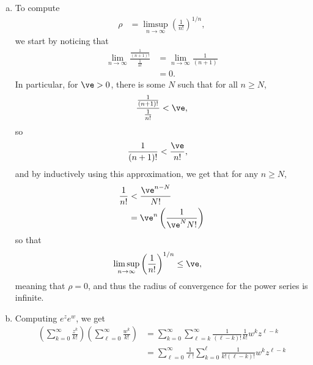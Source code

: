 \documentclass[10pt]{mypackage}
\begin{document}
\begin{solution}\hfill
  \begin{enumerate}[(a)]
    \item To compute
      \begin{align*}
        \rho &= \limsup_{n\rightarrow\infty} \left( \frac{1}{n!} \right)^{1/n},
      \end{align*}
      we start by noticing that
      \begin{align*}
        \lim_{n\rightarrow\infty} \frac{\frac{1}{\left( n+1 \right)!}}{\frac{1}{n!}} &= \lim_{n\rightarrow\infty} \frac{1}{\left( n+1 \right)}\\
                                                                                     &= 0.
      \end{align*}
      In particular, for $\ve > 0$, there is some $N$ such that for all $n\geq N$,
      \begin{align*}
        \frac{\frac{1}{\left( n+1 \right)!}}{\frac{1}{n!}} < \ve,
      \end{align*}
      so
      \begin{align*}
        \frac{1}{\left( n+1 \right)!} &< \frac{\ve}{n!},
      \end{align*}
      and by inductively using this approximation, we get that for any $n\geq N$,
      \begin{align*}
        \frac{1}{n!} &<  \frac{\ve^{n-N}}{N!}\\
                     &= \ve^{n} \left( \frac{1}{\ve^{N}N!} \right)
      \end{align*}
      so that
      \begin{align*}
        \limsup_{n\rightarrow\infty} \left( \frac{1}{n!} \right)^{1/n} &\leq \ve,
      \end{align*}
      meaning that $\rho = 0$, and thus the radius of convergence for the power series is infinite.
    \item Computing $e^{z}e^{w}$, we get
      \begin{align*}
        \left( \sum_{k=0}^{\infty}\frac{z^{k}}{k!} \right)\left( \sum_{\ell = 0}^{\infty}\frac{w^{k}}{k!} \right) &= \sum_{k=0}^{\infty}\sum_{\ell = k}^{\infty} \frac{1}{\left( \ell - k \right)!}\frac{1}{k!}w^{k}z^{\ell - k}\\
                                                                                                                  &= \sum_{\ell = 0}^{\infty} \frac{1}{\ell!} \sum_{k=0}^{\ell} \frac{1}{k!\left( \ell-k \right)!} w^{k}z^{\ell - k}\\

\end{align*}
\end{enumerate}
\end{solution}
\end{document}
